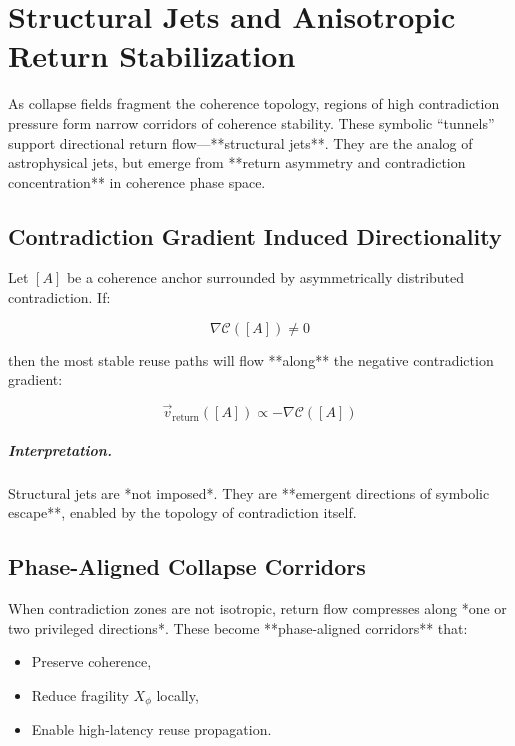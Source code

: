\chapter{Structural Jets and Anisotropic Return Stabilization} \label{chapter:jets-and-directionality}

As collapse fields fragment the coherence topology, regions of high contradiction pressure form narrow corridors of coherence stability. These symbolic “tunnels” support directional return flow—**structural jets**. They are the analog of astrophysical jets, but emerge from **return asymmetry and contradiction concentration** in coherence phase space.

\section{Contradiction Gradient Induced Directionality}

Let $[A]$ be a coherence anchor surrounded by asymmetrically distributed contradiction. If:

\[
\nabla \mathcal{C}([A]) \ne 0
\]

then the most stable reuse paths will flow **along** the negative contradiction gradient:

\[
\vec{v}_{\text{return}}([A]) \propto -\nabla \mathcal{C}([A])
\]

\paragraph{Interpretation.}
Structural jets are *not imposed*. They are **emergent directions of symbolic escape**, enabled by the topology of contradiction itself.

\section{Phase-Aligned Collapse Corridors}

When contradiction zones are not isotropic, return flow compresses along *one or two privileged directions*. These become **phase-aligned corridors** that:

\begin{itemize}
  \item Preserve coherence,
  \item Reduce fragility $X_\phi$ locally,
  \item Enable high-latency reuse propagation.
\end{itemize}

